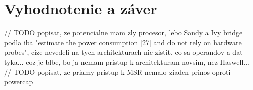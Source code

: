 \section{Vyhodnotenie a záver}
// TODO popisat, ze potencialne mam zly procesor, lebo Sandy a Ivy bridge podla \cite{Platypus} iba "estimate the power consumption [27] and do not rely
on hardware probes", cize nevedeli na tych architekturach nic zistit, co sa operandov a dat tyka... coz je blbe, bo ja nemam pristup k architekturam novsim,
nez Haswell...
// TODO popisat, ze priamy pristup k MSR nemalo ziaden prinos oproti powercap

